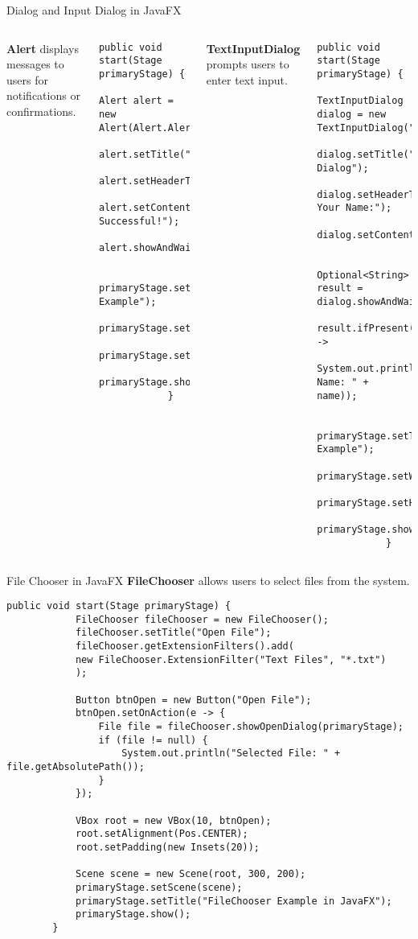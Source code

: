 \documentclass[aspectratio=169, table]{beamer}
\begin{document}
\begin{frame}[fragile]{Dialog and Input Dialog in JavaFX}
	\vspace{10pt}
	\begin{columns}[t]
		\textbf{Alert} displays messages to users for notifications or confirmations.
		\begin{lstlisting}[style=JavaStyle]
			public void start(Stage primaryStage) {
				Alert alert = new Alert(Alert.AlertType.INFORMATION);
				alert.setTitle("Information");
				alert.setHeaderText(null);
				alert.setContentText("Operation Successful!");
				alert.showAndWait();
				
				primaryStage.setTitle("Alert Example");
				primaryStage.setWidth(300);
				primaryStage.setHeight(200);
				primaryStage.show();
			}
		\end{lstlisting}
		
		\textbf{TextInputDialog} prompts users to enter text input.
		\begin{lstlisting}[style=JavaStyle]
			public void start(Stage primaryStage) {
				TextInputDialog dialog = new TextInputDialog("Default");
				dialog.setTitle("Input Dialog");
				dialog.setHeaderText("Enter Your Name:");
				dialog.setContentText("Name:");
				
				Optional<String> result = dialog.showAndWait();
				result.ifPresent(name -> 
				System.out.println("Entered Name: " + name));
				
				primaryStage.setTitle("TextInputDialog Example");
				primaryStage.setWidth(300);
				primaryStage.setHeight(200);
				primaryStage.show();
			}
		\end{lstlisting}
	\end{columns}
\end{frame}


\begin{frame}[fragile]{File Chooser in JavaFX}
	\vspace{30pt}
	\textbf{FileChooser} allows users to select files from the system.
	\begin{lstlisting}[style=JavaStyle]
		public void start(Stage primaryStage) {
			FileChooser fileChooser = new FileChooser();
			fileChooser.setTitle("Open File");
			fileChooser.getExtensionFilters().add(
			new FileChooser.ExtensionFilter("Text Files", "*.txt")
			);
			
			Button btnOpen = new Button("Open File");
			btnOpen.setOnAction(e -> {
				File file = fileChooser.showOpenDialog(primaryStage);
				if (file != null) {
					System.out.println("Selected File: " + file.getAbsolutePath());
				}
			});
			
			VBox root = new VBox(10, btnOpen);
			root.setAlignment(Pos.CENTER);
			root.setPadding(new Insets(20));
			
			Scene scene = new Scene(root, 300, 200);
			primaryStage.setScene(scene);
			primaryStage.setTitle("FileChooser Example in JavaFX");
			primaryStage.show();
		}
	\end{lstlisting}
\end{frame}
\end{document}
